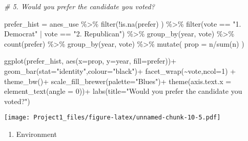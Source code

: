 \documentclass[
]{article}
\newenvironment{Shaded}{\begin{snugshade}}{\end{snugshade}}
\newcommand{\AttributeTok}[1]{\textcolor[rgb]{0.77,0.63,0.00}{#1}}
\newcommand{\CommentTok}[1]{\textcolor[rgb]{0.56,0.35,0.01}{\textit{#1}}}
\newcommand{\DecValTok}[1]{\textcolor[rgb]{0.00,0.00,0.81}{#1}}
\newcommand{\FunctionTok}[1]{\textcolor[rgb]{0.00,0.00,0.00}{#1}}
\newcommand{\NormalTok}[1]{#1}
\newcommand{\OtherTok}[1]{\textcolor[rgb]{0.56,0.35,0.01}{#1}}
\newcommand{\SpecialCharTok}[1]{\textcolor[rgb]{0.00,0.00,0.00}{#1}}
\newcommand{\StringTok}[1]{\textcolor[rgb]{0.31,0.60,0.02}{#1}}
\providecommand{\tightlist}{%
  \setlength{\itemsep}{0pt}\setlength{\parskip}{0pt}}
\begin{document}
\begin{Shaded}
\begin{Highlighting}[]
\CommentTok{\# 5. Would you prefer the candidate you voted?}

\NormalTok{prefer\_hist }\OtherTok{=}\NormalTok{ anes\_use }\SpecialCharTok{\%\textgreater{}\%}
  \FunctionTok{filter}\NormalTok{(}\SpecialCharTok{!}\FunctionTok{is.na}\NormalTok{(prefer) ) }\SpecialCharTok{\%\textgreater{}\%}
  \FunctionTok{filter}\NormalTok{(vote }\SpecialCharTok{==} \StringTok{"1. Democrat"} \SpecialCharTok{|}\NormalTok{ vote }\SpecialCharTok{==} \StringTok{"2. Republican"}\NormalTok{) }\SpecialCharTok{\%\textgreater{}\%}
  \FunctionTok{group\_by}\NormalTok{(year, vote) }\SpecialCharTok{\%\textgreater{}\%}
  \FunctionTok{count}\NormalTok{(prefer) }\SpecialCharTok{\%\textgreater{}\%}
  \FunctionTok{group\_by}\NormalTok{(year, vote) }\SpecialCharTok{\%\textgreater{}\%}
  \FunctionTok{mutate}\NormalTok{(}
    \AttributeTok{prop =}\NormalTok{ n}\SpecialCharTok{/}\FunctionTok{sum}\NormalTok{(n)}
\NormalTok{  )}

\FunctionTok{ggplot}\NormalTok{(prefer\_hist,}
       \FunctionTok{aes}\NormalTok{(}\AttributeTok{x=}\NormalTok{prop, }\AttributeTok{y=}\NormalTok{year, }\AttributeTok{fill=}\NormalTok{prefer))}\SpecialCharTok{+}
  \FunctionTok{geom\_bar}\NormalTok{(}\AttributeTok{stat=}\StringTok{"identity"}\NormalTok{,}\AttributeTok{colour=}\StringTok{"black"}\NormalTok{)}\SpecialCharTok{+}
  \FunctionTok{facet\_wrap}\NormalTok{(}\SpecialCharTok{\textasciitilde{}}\NormalTok{vote,}\AttributeTok{ncol=}\DecValTok{1}\NormalTok{) }\SpecialCharTok{+}
  \FunctionTok{theme\_bw}\NormalTok{()}\SpecialCharTok{+}
  \FunctionTok{scale\_fill\_brewer}\NormalTok{(}\AttributeTok{palette=}\StringTok{"Blues"}\NormalTok{)}\SpecialCharTok{+}
  \FunctionTok{theme}\NormalTok{(}\AttributeTok{axis.text.x =} \FunctionTok{element\_text}\NormalTok{(}\AttributeTok{angle =} \DecValTok{0}\NormalTok{))}\SpecialCharTok{+}
  \FunctionTok{labs}\NormalTok{(}\AttributeTok{title=}\StringTok{"Would you prefer the candidate you voted?"}\NormalTok{)}
\end{Highlighting}
\end{Shaded}

\texttt{[image: Project1\_files/figure-latex/unnamed-chunk-10-5.pdf]}

\begin{enumerate}
\def\labelenumi{\arabic{enumi}.}
\setcounter{enumi}{5}
\tightlist
\item
  Environment
\end{enumerate}
\end{document}
